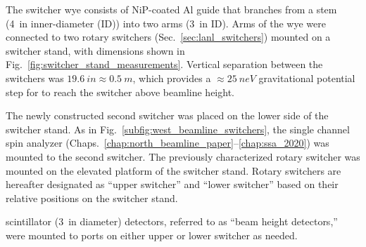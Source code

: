 The switcher wye consists of NiP-coated Al guide that branches from a stem (\qty{4}{in} inner-diameter (ID)) into two arms (\qty{3}{in} ID). Arms of the wye were connected to two rotary switchers (Sec.~\ref{sec:lanl_switchers}) mounted on a switcher stand, with dimensions shown in Fig.~\ref{fig:switcher_stand_measurements}. Vertical separation between the switchers was $\qty{19.6}{in}\approx \qty{0.5}{m}$, which provides a $\approx \qty{25}{neV}$ gravitational potential step for \ucn to reach the switcher above beamline height.

The newly constructed second switcher was placed on the lower side of the switcher stand. As in Fig.~\ref{subfig:west_beamline_switchers}, the single channel spin analyzer (Chaps.~\ref{chap:north_beamline_paper}--\ref{chap:ssa_2020}) was mounted to the second switcher. The previously characterized rotary switcher was mounted on the elevated platform of the switcher stand. Rotary switchers are hereafter designated as ``upper switcher'' and ``lower switcher'' based on their relative positions on the switcher stand.

\BZnS scintillator (\qty{3}{in} diameter) \ucn detectors, referred to as ``beam height detectors,'' were mounted to ports on either upper or lower switcher as needed.


